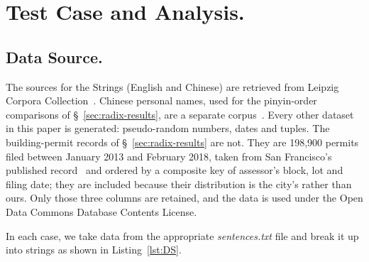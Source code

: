 \documentclass[twoside,leqno,twocolumn]{article}
\begin{document}
\section{Test Case and Analysis.}

\subsection{Data Source.}
\label{sec:data-source}
The sources for the Strings (English and  Chinese) are retrieved from Leipzig Corpora Collection~\cite{GOLDHAHN12.327}.
Chinese personal names, used for the pinyin-order comparisons of \S~\ref{sec:radix-results}, are a separate corpus~\cite{wainshine2020chinesenames}.
Every other dataset in this paper is generated: pseudo-random numbers, dates and tuples.
The building-permit records of \S~\ref{sec:radix-results} are not.
They are 198,900 permits filed between January 2013 and February 2018, taken from San Francisco's published
record~\cite{sf-building-permits} and ordered by a composite key of assessor's block, lot and filing
date; they are included because their distribution is the city's rather than ours.
Only those three columns are retained, and the data is used under the Open Data Commons Database
Contents License.

In each case, we take data from the appropriate \emph{sentences.txt} file and break it up into strings as shown in Listing~\ref{lst:DS}.
\end{document}
